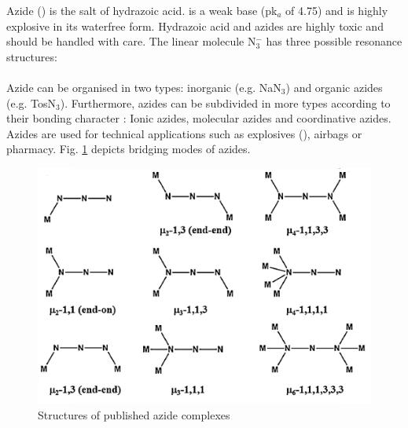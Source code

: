 Azide () is the salt of hydrazoic acid.  is a weak base (pk$_a$ of 4.75) and is highly explosive in its waterfree form.
Hydrazoic acid and azides are highly toxic and should be handled with care. The linear molecule N$_3^-$ has three possible resonance structures: \\
\\
Azide can be organised in two types: inorganic  (e.g. NaN$_3$) and organic azides (e.g. TosN$_3$). \cite{holub}
 Furthermore, azides can be subdivided in more types according to their bonding character \cite{mueller}: Ionic azides, molecular azides and coordinative azides.\\
Azides are used for technical applications such as explosives (), airbags or pharmacy. Fig. \ref{fig:az} depicts bridging modes of azides. 
\begin{figure}[htpb!]
\centering
\includegraphics[scale=1]{figures/azidescheme.png}
\caption{Structures of published azide complexes \cite{han2015}}
\label{fig:az}
\end{figure}

